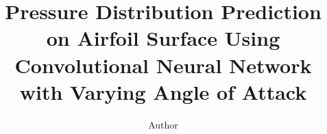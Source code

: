 \title{Pressure Distribution Prediction on Airfoil Surface Using Convolutional Neural Network with Varying Angle of Attack}
\author{Author}
